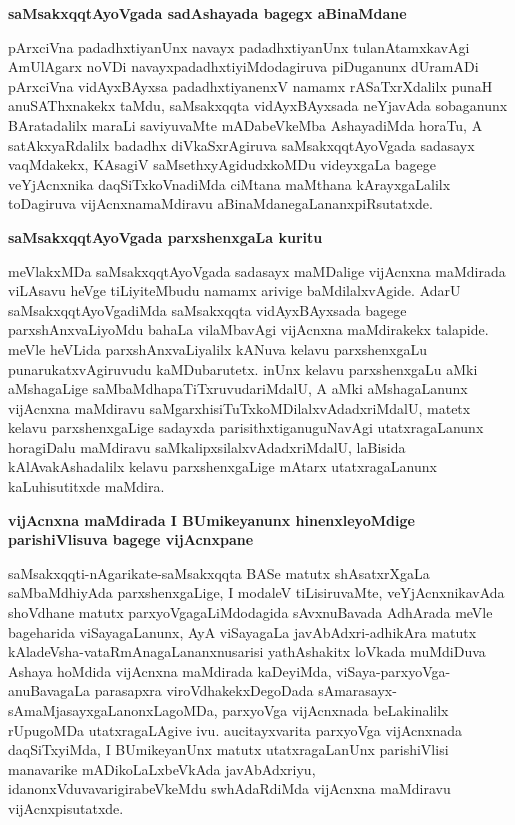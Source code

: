 \noindent
\textbf{saMsakxqqtAyoVgada sadAshayada bagegx aBinaMdane}

pArxciVna padadhxtiyanUnx navayx padadhxtiyanUnx tulanAtamxkavAgi AmUlAgarx noVDi navayxpadadhxtiyiMdodagiruva piDuganunx dUramADi pArxciVna vidAyxBAyxsa padadhxtiyanenxV namamx rASaTxrXdalilx punaH anuSAThxnakekx taMdu, saMsakxqqta vidAyxBAyxsada neYjavAda sobaganunx BAratadalilx maraLi saviyuvaMte mADabeVkeMba
AshayadiMda horaTu, A satAkxyaRdalilx badadhx diVkaSxrAgiruva saMsakxqqtAyoVgada sadasayx vaqMdakekx, KAsagiV saMsethxyAgidudxkoMDu videyxgaLa bagege veYjAcnxnika daqSiTxkoVnadiMda ciMtana maMthana kArayxgaLalilx toDagiruva vijAcnxnamaMdiravu aBinaMdanegaLananxpiRsutatxde.

\noindent
\textbf{saMsakxqqtAyoVgada parxshenxgaLa kuritu}\label{page29}

meVlakxMDa saMsakxqqtAyoVgada sadasayx maMDalige vijAcnxna maMdirada viLAsavu heVge tiLiyiteMbudu namamx arivige baMdilalxvAgide. AdarU saMsakxqqtAyoVgadiMda saMsakxqqta vidAyxBAyxsada bagege parxshAnxvaLiyoMdu bahaLa vilaMbavAgi vijAcnxna maMdirakekx talapide. meVle heVLida parxshAnxvaLiyalilx kANuva kelavu parxshenxgaLu punarukatxvAgiruvudu kaMDubarutetx. inUnx kelavu parxshenxgaLu aMki aMshagaLige saMbaMdhapaTiTxruvudariMdalU, A aMki aMshagaLanunx vijAcnxna maMdiravu saMgarxhisiTuTxkoMDilalxvAdadxriMdalU, matetx kelavu parxshenxgaLige sadayxda parisithxtiganuguNavAgi utatxragaLanunx horagiDalu maMdiravu saMkalipxsilalxvAdadxriMdalU, laBisida kAlAvakAshadalilx kelavu parxshenxgaLige mAtarx utatxragaLanunx kaLuhisutitxde maMdira.

\noindent
\textbf{vijAcnxna maMdirada I BUmikeyanunx hinenxleyoMdige parishiVlisuva bagege vijAcnxpane}\label{page29}

saMsakxqqti-nAgarikate-saMsakxqqta BASe matutx shAsatxrXgaLa saMbaMdhiyAda parxshenxgaLige, I modaleV tiLisiruvaMte, veYjAcnxnikavAda shoVdhane matutx parxyoVgagaLiMdodagida sAvxnuBavada AdhArada meVle bageharida viSayagaLanunx, AyA viSayagaLa javAbAdxri-adhikAra matutx kAladeVsha-vataRmAnagaLananxnusarisi yathAshakitx loVkada muMdiDuva Ashaya hoMdida vijAcnxna maMdirada kaDeyiMda, viSaya-parxyoVga-anuBavagaLa parasapxra viroVdhakekxDegoDada sAmarasayx-sAmaMjasayxgaLanonxLagoMDa, parxyoVga vijAcnxnada beLakinalilx rUpugoMDa utatxragaLAgive ivu. aucitayxvarita parxyoVga vijAcnxnada daqSiTxyiMda, I BUmikeyanUnx matutx utatxragaLanUnx parishiVlisi manavarike mADikoLaLxbeVkAda javAbAdxriyu, idanonxVduvavarigirabeVkeMdu swhAdaRdiMda vijAcnxna maMdiravu vijAcnxpisutatxde.

